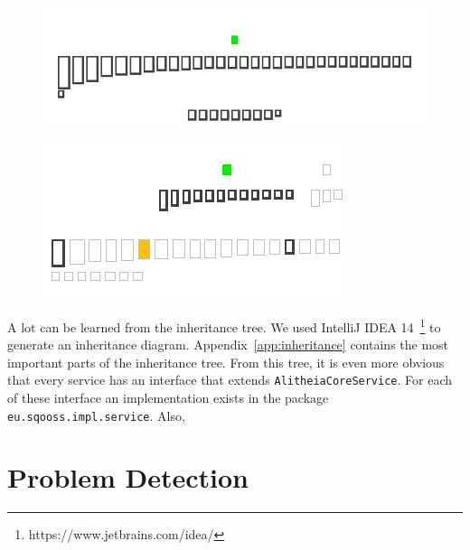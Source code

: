 \documentclass{article}
\begin{document}
\begin{figure}[h]
\centering
\begin{minipage}{.45\textwidth}
  \centering
  \includegraphics[width=0.9\linewidth]{daoobject-inheritance}
  \label{fig:daobject}
\end{minipage}\hspace{5mm}%
\begin{minipage}{.45\textwidth}
  \centering
  \includegraphics[width=0.9\linewidth]{alitheiacoreservice-inheritance}
  \label{fig:alitheacoreservice}
\end{minipage}
\end{figure}

A lot can be learned from the inheritance tree. We used IntelliJ IDEA 14~\footnote{https://www.jetbrains.com/idea/} to generate an inheritance diagram. Appendix~\ref{app:inheritance} contains the most important parts of the inheritance tree. From this tree, it is even more obvious that every service has an interface that extends \verb|AlitheiaCoreService|. For each of these interface an implementation exists in the package \verb|eu.sqooss.impl.service|. Also, %

\section{Problem Detection}
\end{document}

